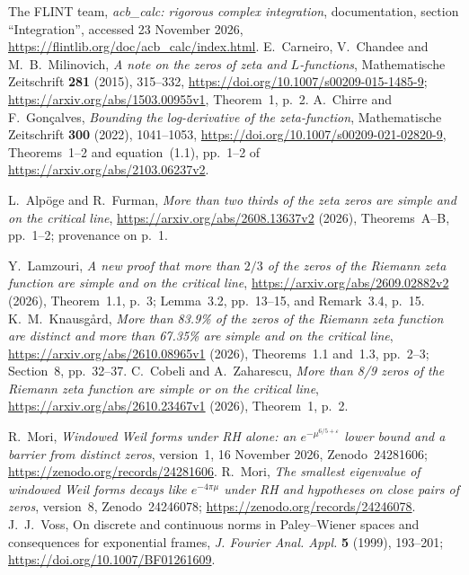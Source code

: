  The FLINT team, \emph{acb\_calc: rigorous complex integration}, documentation, section ``Integration'', accessed 23 November 2026, \url{https://flintlib.org/doc/acb_calc/index.html}.
 E.~Carneiro, V.~Chandee and M.~B.~Milinovich, \emph{A note on the zeros of zeta and $L$-functions}, Mathematische Zeitschrift \textbf{281} (2015), 315--332, \url{https://doi.org/10.1007/s00209-015-1485-9}; \url{https://arxiv.org/abs/1503.00955v1}, Theorem~1, p.~2.
 A.~Chirre and F.~Gon\c calves, \emph{Bounding the log-derivative of the zeta-function}, Mathematische Zeitschrift \textbf{300} (2022), 1041--1053, \url{https://doi.org/10.1007/s00209-021-02820-9}, Theorems~1--2 and equation~(1.1), pp.~1--2 of \url{https://arxiv.org/abs/2103.06237v2}.

 L.~Alp\"oge and R.~Furman, \emph{More than two thirds of the zeta zeros are simple and on the critical line}, \url{https://arxiv.org/abs/2608.13637v2} (2026), Theorems~A--B, pp.~1--2; provenance on p.~1.

 Y.~Lamzouri, \emph{A new proof that more than $2/3$ of the zeros of the Riemann zeta function are simple and on the critical line}, \url{https://arxiv.org/abs/2609.02882v2} (2026), Theorem~1.1, p.~3; Lemma~3.2, pp.~13--15, and Remark~3.4, p.~15.
 K.~M.~Knausg\aa rd, \emph{More than 83.9\% of the zeros of the Riemann zeta function are distinct and more than 67.35\% are simple and on the critical line}, \url{https://arxiv.org/abs/2610.08965v1} (2026), Theorems~1.1 and~1.3, pp.~2--3; Section~8, pp.~32--37.
 C.~Cobeli and A.~Zaharescu, \emph{More than 8/9 zeros of the Riemann zeta function are simple or on the critical line}, \url{https://arxiv.org/abs/2610.23467v1} (2026), Theorem~1, p.~2.

R.~Mori, \emph{Windowed Weil forms under RH alone: an
\(e^{-\mu^{6/5+\varepsilon}}\) lower bound and a barrier from distinct
zeros}, version~1, 16 November 2026, Zenodo~24281606;
\url{https://zenodo.org/records/24281606}.
R.~Mori, \emph{The smallest eigenvalue of windowed Weil forms decays
like \(e^{-4\pi\mu}\) under RH and hypotheses on close pairs of zeros},
version~8, Zenodo~24246078;
\url{https://zenodo.org/records/24246078}.
J.~J.~Voss, On discrete and continuous norms in Paley--Wiener spaces
and consequences for exponential frames,
\emph{J. Fourier Anal. Appl.} \textbf{5} (1999), 193--201;
\url{https://doi.org/10.1007/BF01261609}.

